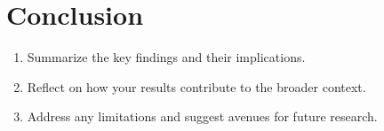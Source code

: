 \section{Conclusion}\vspace{-2mm}

\begin{enumerate}
    \item Summarize the key findings and their implications.
    \item Reflect on how your results contribute to the broader context.
    \item Address any limitations and suggest avenues for future research.
\end{enumerate}
